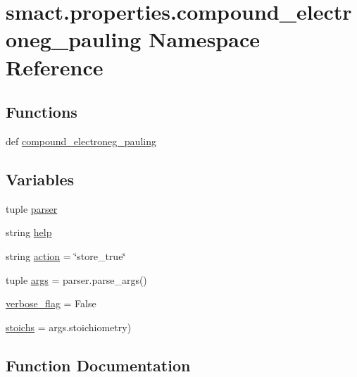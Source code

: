 \hypertarget{namespacesmact_1_1properties_1_1compound__electroneg__pauling}{}\section{smact.\+properties.\+compound\+\_\+electroneg\+\_\+pauling Namespace Reference}
\label{namespacesmact_1_1properties_1_1compound__electroneg__pauling}
\subsection*{Functions}
\begin{DoxyCompactItemize}
\item 
def \hyperlink{namespacesmact_1_1properties_1_1compound__electroneg__pauling_ab38f5a1321fa081c1ffb5fb2fe24171d}{compound\+\_\+electroneg\+\_\+pauling}
\end{DoxyCompactItemize}
\subsection*{Variables}
\begin{DoxyCompactItemize}
\item 
tuple \hyperlink{namespacesmact_1_1properties_1_1compound__electroneg__pauling_a1f1c8773c760e27a71b2f2447a812b3c}{parser}
\item 
string \hyperlink{namespacesmact_1_1properties_1_1compound__electroneg__pauling_aa6c489930b1288598598e89ed78634af}{help}
\item 
string \hyperlink{namespacesmact_1_1properties_1_1compound__electroneg__pauling_ac8037eaecb7855f19cbd9ddeec574a0c}{action} = \char`\"{}store\+\_\+true\char`\"{}
\item 
tuple \hyperlink{namespacesmact_1_1properties_1_1compound__electroneg__pauling_a2e9bb2f62931326a2e8727a8e89b7ba7}{args} = parser.\+parse\+\_\+args()
\item 
\hyperlink{namespacesmact_1_1properties_1_1compound__electroneg__pauling_a396461def50d33825a424b7d8885a84d}{verbose\+\_\+flag} = False
\item 
\hyperlink{namespacesmact_1_1properties_1_1compound__electroneg__pauling_a582e6cce9e104f4732a1b169652dbdd4}{stoichs} = args.\+stoichiometry)
\end{DoxyCompactItemize}


\subsection{Function Documentation}
\hypertarget{namespacesmact_1_1properties_1_1compound__electroneg__pauling_ab38f5a1321fa081c1ffb5fb2fe24171d}{}
